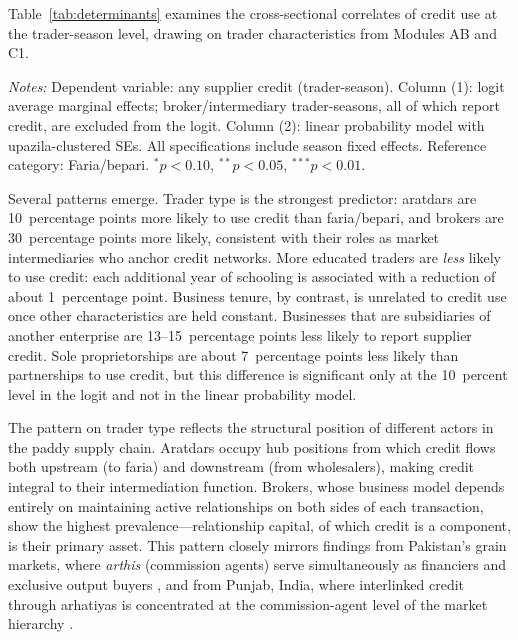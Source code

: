 \documentclass[authoryear,preprint,review,12pt]{elsarticle}
\begin{document}
Table~\ref{tab:determinants} examines the cross-sectional correlates of
credit use at the trader-season level, drawing on trader characteristics
from Modules AB and C1.

\begin{table}[htbp]
  \centering
  \caption{Correlates of Supplier Credit Use (Paddy Traders)}
  \label{tab:determinants}
  \begin{singlespace}
  \begin{threeparttable}
    
    \begin{tablenotes}\footnotesize
      \item \textit{Notes:} Dependent variable: any supplier credit
      (trader-season). Column (1): logit average marginal effects;
      broker/intermediary trader-seasons, all of which report credit, are
      excluded from the logit.
      Column (2): linear probability model with upazila-clustered SEs.
      All specifications include season fixed effects.
      Reference category: Faria/bepari.
      $^{*}p<0.10$, $^{**}p<0.05$, $^{***}p<0.01$.
    \end{tablenotes}
  \end{threeparttable}
  \end{singlespace}
\end{table}

Several patterns emerge. Trader type is the strongest predictor: aratdars
are 10~percentage points more likely to use credit than faria/bepari, and
brokers are 30~percentage points more likely, consistent with their roles
as market intermediaries who anchor credit networks. More educated traders
are \emph{less} likely to use credit: each additional year of schooling is
associated with a reduction of about 1~percentage point. Business tenure,
by contrast, is unrelated to credit use once other characteristics are
held constant. Businesses that are subsidiaries of another enterprise are
13--15~percentage points less likely to report supplier credit. Sole
proprietorships are about 7~percentage points less likely than partnerships
to use credit, but this difference is significant only at the 10~percent
level in the logit and not in the linear probability model.

The pattern on trader type reflects the structural position of different
actors in the paddy supply chain. Aratdars occupy hub positions from which
credit flows both upstream (to faria) and downstream (from wholesalers),
making credit integral to their intermediation function. Brokers, whose
business model depends entirely on maintaining active relationships on both
sides of each transaction, show the highest prevalence---relationship
capital, of which credit is a component, is their primary asset. This
pattern closely mirrors findings from Pakistan's grain markets, where
\textit{arthis} (commission agents) serve simultaneously as financiers and
exclusive output buyers \citep{haq_etal2013}, and from Punjab, India,
where interlinked credit through arhatiyas is concentrated at the
commission-agent level of the market hierarchy \citep{gill2004}.
\end{document}
